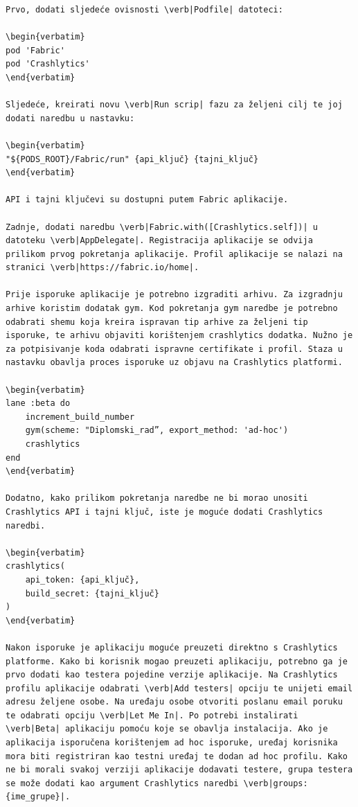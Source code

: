 \documentclass[times, utf8, diplomski, numeric]{fer}
\begin{document}
\begin{appendices}
\begin{lstlisting}[caption=Provjera postojanja i pokretanje Swiftlint alata, label=listing:swiftlint]
Prvo, dodati sljedeće ovisnosti \verb|Podfile| datoteci:

\begin{verbatim}
pod 'Fabric'
pod 'Crashlytics'
\end{verbatim}

Sljedeće, kreirati novu \verb|Run scrip| fazu za željeni cilj te joj dodati naredbu u nastavku:

\begin{verbatim}
"${PODS_ROOT}/Fabric/run" {api_ključ} {tajni_ključ}
\end{verbatim}

API i tajni ključevi su dostupni putem Fabric aplikacije.

Zadnje, dodati naredbu \verb|Fabric.with([Crashlytics.self])| u datoteku \verb|AppDelegate|. Registracija aplikacije se odvija prilikom prvog pokretanja aplikacije. Profil aplikacije se nalazi na stranici \verb|https://fabric.io/home|.

Prije isporuke aplikacije je potrebno izgraditi arhivu. Za izgradnju arhive koristim dodatak gym. Kod pokretanja gym naredbe je potrebno odabrati shemu koja kreira ispravan tip arhive za željeni tip isporuke, te arhivu objaviti korištenjem crashlytics dodatka. Nužno je za potpisivanje koda odabrati ispravne certifikate i profil. Staza u nastavku obavlja proces isporuke uz objavu na Crashlytics platformi.

\begin{verbatim}
lane :beta do
    increment_build_number
    gym(scheme: "Diplomski_rad”, export_method: 'ad-hoc')
    crashlytics
end
\end{verbatim}

Dodatno, kako prilikom pokretanja naredbe ne bi morao unositi Crashlytics API i tajni ključ, iste je moguće dodati Crashlytics naredbi.

\begin{verbatim}
crashlytics(
    api_token: {api_ključ},
    build_secret: {tajni_ključ}
)
\end{verbatim}

Nakon isporuke je aplikaciju moguće preuzeti direktno s Crashlytics platforme. Kako bi korisnik mogao preuzeti aplikaciju, potrebno ga je prvo dodati kao testera pojedine verzije aplikacije. Na Crashlytics profilu aplikacije odabrati \verb|Add testers| opciju te unijeti email adresu željene osobe. Na uređaju osobe otvoriti poslanu email poruku te odabrati opciju \verb|Let Me In|. Po potrebi instalirati \verb|Beta| aplikaciju pomoću koje se obavlja instalacija. Ako je aplikacija isporučena korištenjem ad hoc isporuke, uređaj korisnika mora biti registriran kao testni uređaj te dodan ad hoc profilu. Kako ne bi morali svakoj verziji aplikacije dodavati testere, grupa testera se može dodati kao argument Crashlytics naredbi \verb|groups: {ime_grupe}|.


\end{lstlisting}
\end{appendices}
\end{document}
